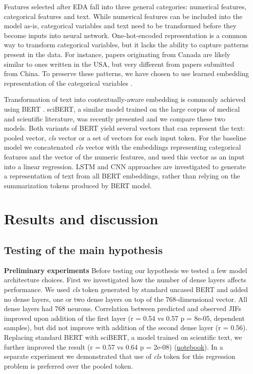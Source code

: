 \documentclass[11pt]{article}
\begin{document}
Features selected after EDA fall into three general categories: numerical features, categorical features and text. While numerical features can be included into the model as-is, categorical variables and text need to be transformed before they become inputs into neural network. One-hot-encoded representation is a common way to transform categorical variables, but it lacks the ability to capture patterns present in the data. For instance, papers originating from Canada are likely similar to ones written in the USA, but very different from papers submitted from China. To preserve these patterns, we have chosen to use learned embedding representation of the categorical variables \citep{DBLP:journals/corr/GuoB16}.

Transformation of text into contextually-aware embedding is commonly achieved using BERT \citep{DBLP:journals/corr/abs-1810-04805}. sciBERT, a similar model trained on the large corpus of medical and scientific literature, was recently presented \citep{DBLP:journals/corr/abs-1903-10676} and we compare these two models. Both variants of BERT yield several vectors that can represent the text: pooled vector, \textit{cls} vector or a set of vectors for each input token. For the baseline model we concatenated \textit{cls} vector with the embeddings representing categorical features and the vector of the numeric features, and used this vector as an input into a linear regression. LSTM and CNN approaches are investigated to generate a representation of text from all BERT embeddings, rather than relying on the summarization tokens produced by BERT model.

\section{Results and discussion}
\subsection{Testing of the main hypothesis}
\textbf{Preliminary experiments} Before testing our hypothesis we tested a few model architecture choices. First we investigated how the number of dense layers affects performance. We used \textit{cls} token generated by standard uncased BERT and added no dense layers, one or two dense layers on top of the 768-dimensional vector. All dense layers had 768 neurons. Correlation between predicted and observed JIFs improved upon addition of the first layer (r = 0.54 vs 0.57 p = 8e-05, dependent samples), but did not improve with addition of the second dense layer (r = 0.56). Replacing standard BERT with sciBERT, a model trained on scientific text, we further improved the result (r = 0.57 vs 0.64 p = 2e-08) (\href{https://github.com/ArtemChemist/w266_project/blob/main/Notebooks/Dense%20layers%20and%20BERT%20vs%20sciBERT.ipynb}{notebook}). In a separate experiment we demonstrated that use of \textit{cls} token for this regression problem is preferred over the pooled token.
\end{document}
